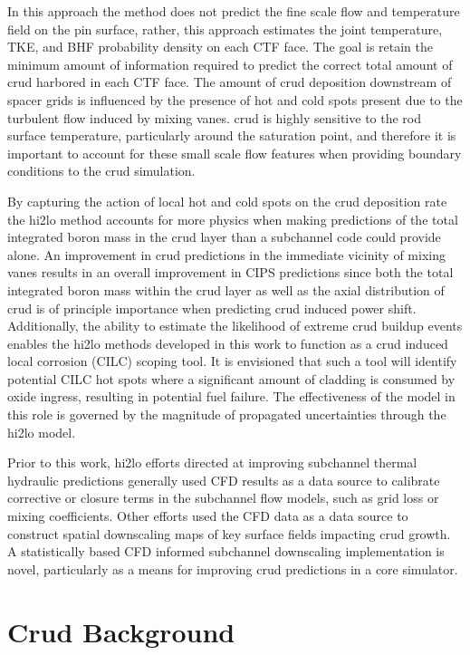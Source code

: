 In this approach the method does not predict the fine scale flow and temperature field on the pin surface, rather, this approach estimates the joint temperature, TKE, and BHF probability density on each CTF face.  The goal is retain the minimum amount of information required to predict the correct total amount of crud harbored in each CTF face.  The amount of crud deposition downstream of spacer grids is influenced by the presence of hot and cold spots present due to the turbulent flow induced by mixing vanes.  crud is highly sensitive to the rod surface temperature, particularly around the saturation point, and therefore it is important to account for these small scale flow features when providing boundary conditions to the crud simulation.

By capturing the action of local hot and cold spots on the crud deposition rate the hi2lo method accounts for more physics when making predictions of the total integrated boron mass in the crud layer than a subchannel code could provide alone.  An improvement in crud predictions in the immediate vicinity of mixing vanes results in an overall improvement in CIPS predictions since both the total integrated boron mass within the crud layer as well as the axial distribution of crud is of principle importance when predicting crud induced power shift.  Additionally, the ability to estimate the likelihood of extreme crud buildup events enables the hi2lo methods developed in this work to function as a crud induced local corrosion (CILC) scoping tool.  It is envisioned that such a tool will identify potential CILC hot spots where a significant amount of cladding is consumed by oxide ingress, resulting in potential fuel failure.  The effectiveness of the model in this role is governed by the magnitude of propagated uncertainties through the hi2lo model.

Prior to this work, hi2lo efforts directed at improving subchannel thermal hydraulic predictions generally used CFD results as a data source to calibrate corrective or closure terms in the subchannel flow models, such as grid loss or mixing coefficients.  Other efforts used the CFD data as a data source to construct spatial downscaling maps of key surface fields impacting crud growth.  A statistically based CFD informed subchannel downscaling implementation is novel, particularly as a means for improving crud predictions in a core simulator.

\section{Crud Background}

